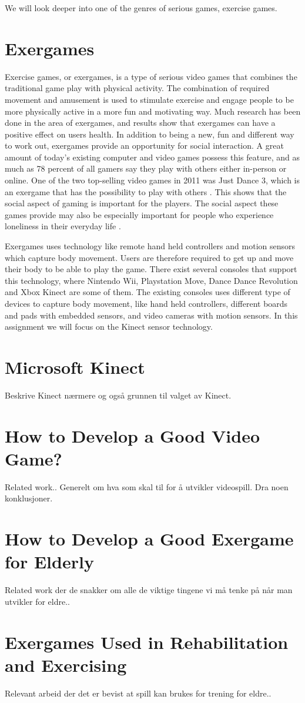 We will look deeper into one of the genres of serious games, exercise games.  

\section{Exergames}
Exercise games, or exergames, is a type of serious video games that combines the traditional game play with physical activity. The combination of required movement and amusement is used to stimulate exercise and engage people to be more physically active in a more fun and motivating way. Much research has been done in the area of exergames, and results show that exergames can have a positive effect on users health. In addition to being a new, fun and different way to work out, exergames provide an opportunity for social interaction. A great amount of today’s existing computer and video games possess this feature, and as much as 78 percent of all gamers say they play with others either in-person or online. One of the two top-selling video games in 2011 was Just Dance 3, which is an exergame that has the possibility to play with others \cite{statistics2012}. This shows that the social aspect of gaming is important for the players. The social aspect these games provide may also be especially important for people who experience loneliness in their everyday life \cite{project}.

Exergames uses technology like remote hand held controllers and motion sensors which capture body movement. Users are therefore required to get up and move their body to be able to play the game. There exist several consoles that support this technology, where Nintendo Wii, Playstation Move, Dance Dance Revolution and Xbox Kinect are some of them. The existing consoles uses different type of devices to capture body movement, like hand held controllers, different boards and pads with embedded sensors, and video cameras with motion sensors. In this assignment we will focus on the Kinect sensor technology. 

\section{Microsoft Kinect}
Beskrive Kinect nærmere og også grunnen til valget av Kinect. 
\section{How to Develop a Good Video Game?}
Related work.. Generelt om hva som skal til for å utvikler videospill. Dra noen konklusjoner.
\section{How to Develop a Good Exergame for Elderly}
Related work der de snakker om alle de viktige tingene vi må tenke på når man utvikler for eldre..
\section{Exergames Used in Rehabilitation and Exercising}
Relevant arbeid der det er bevist at spill kan brukes for trening for eldre.. 
